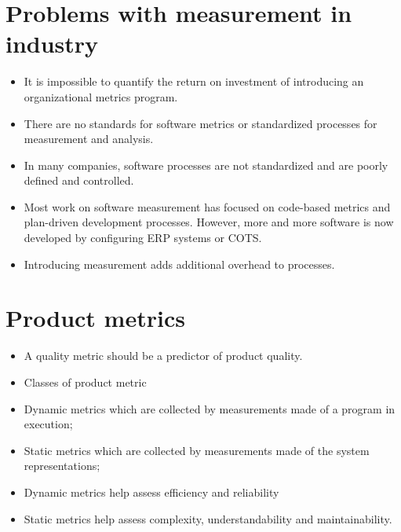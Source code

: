 \section {Problems with measurement in industry}
\begin{itemize}

\item It is impossible to quantify the return on investment of introducing an organizational metrics program.

\item There are no standards for software metrics or standardized processes for measurement and analysis.

\item In many companies, software processes are not standardized and are poorly defined and controlled.

\item Most work on software measurement has focused on code-based metrics and plan-driven development processes. However, more and more software is now developed by configuring ERP systems or COTS.

\item Introducing measurement adds additional overhead to processes.

\end{itemize}
\section {Product metrics}
\begin{itemize}

\item A quality metric should be a predictor of product quality.

\item Classes of product metric

  \item Dynamic metrics which are collected by measurements made of a program in execution;
  \item Static metrics which are collected by measurements made of the system representations;
  \item Dynamic metrics help assess efficiency and reliability

  \item Static metrics help assess complexity, understandability and maintainability.


\end{itemize}

